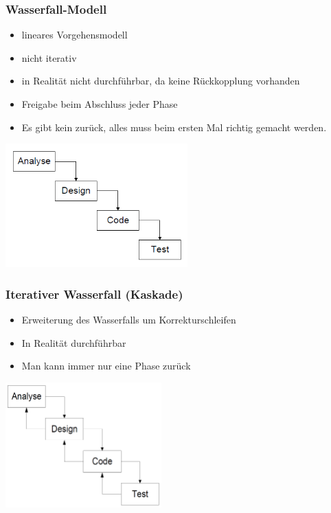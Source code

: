 \subsubsection{Wasserfall-Modell}
\begin{minipage}{10cm}
	\begin{itemize}
		\item lineares Vorgehensmodell
		\item nicht iterativ
		\item in Realität nicht durchführbar, da keine Rückkopplung vorhanden
		\item Freigabe beim Abschluss jeder Phase
		\item Es gibt kein zurück, alles muss beim ersten Mal richtig gemacht werden. 
	\end{itemize}
\end{minipage}
\begin{minipage}{5cm}
	\includegraphics[width=7cm]{images/wasserfallmodell}
\end{minipage}
	
\subsubsection{Iterativer Wasserfall (Kaskade)}
	\begin{minipage}{10cm}
		\begin{itemize}
			\item Erweiterung des Wasserfalls um Korrekturschleifen
			\item In Realität durchführbar
			\item Man kann immer nur eine Phase zurück
		\end{itemize}
	\end{minipage}
	\begin{minipage}{5cm}
	\includegraphics[width=6cm]{images/kaskade.png}	
	\end{minipage}

